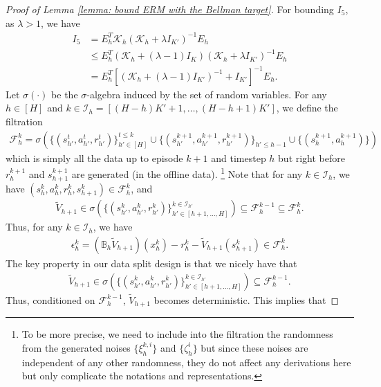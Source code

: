 \documentclass{article} \usepackage{iclr2023/iclr2023_conference,times}
\begin{document}
\begin{proof}[Proof of Lemma \ref{lemma: bound ERM with the Bellman target}]
For bounding $I_5$, as $\lambda > 1$, we have 
\begin{align}
    I_5  &= E_h^T  \mathcal{K}_h ( \mathcal{K}_h + \lambda I_{K'})^{-1} E_h \nonumber \\ 
    &\leq E_h^T  (\mathcal{K}_h + (\lambda-1) I_K) ( \mathcal{K}_h + \lambda I_{K'})^{-1} E_h \nonumber\\ 
    &=  E_h^T  \left[ (\mathcal{K}_h + (\lambda - 1) I_{K'})^{-1} + I_{K'} \right]^{-1} E_h. 
    \label{eq: transform the form of the self-normalized process}
\end{align}
Let $\sigma(\cdot)$ be the $\sigma$-algebra induced by the set of random variables. For any $h \in [H]$ and $k  \in \mathcal{I}_h = [(H - h) K' + 1, \ldots, (H - h + 1) K']$, we define the filtration 
\begin{align*}
    \mathcal{F}^k_h = \sigma \left(\{(s^t_{h'}, a^t_{h'}, r^t_{h'})\}_{h' \in [H]}^{t \leq k} \cup \{(s^{k+1}_{h'}, a^{k+1}_{h'}, r^{k+1}_{h'})\}_{h' \leq h-1} \cup \{(s^{k+1}_h, a^{k+1}_h)\} \right) 
\end{align*}
which is simply all the data up to episode $k+1$ and timestep $h$ but right before $r^{k+1}_h$ and $s^{k+1}_{h+1}$ are generated (in the offline data). \footnote{To be more precise, we need to include into the filtration the randomness from the generated noises $\{\xi^{k,i}_h\}$ and $\{\zeta^i_h\}$ but since these noises are independent of any other randomness, they do not affect any derivations here but only complicate the notations and representations.} Note that for any $k \in \mathcal{I}_h$, we have $(s^k_h, a^k_h, r^k_h, s^k_{h+1}) \in \mathcal{F}^k_h $, and
\begin{align*}
    \tilde{V}_{h+1} \in \sigma \left( \{(s^k_{h'}, a^k_{h'}, r^k_{h'})\}^{k \in \mathcal{I}_{h'}}_{h' \in [h+1, \ldots, H]}  \right) \subseteq \mathcal{F}^{k-1}_h \subseteq \mathcal{F}^k_h. 
\end{align*}
Thus, for any $k \in \mathcal{I}_h$, we have 
\begin{align*}
    \epsilon^k_h = (\mathbb{B}_h \tilde{V}_{h+1})(x^k_h) - r^k_h - \tilde{V}_{h+1}(s^k_{h+1}) \in \mathcal{F}^k_h. 
\end{align*}
The key property in our data split design is that we nicely have that
\begin{align*}
    \tilde{V}_{h+1} \in \sigma \left( \{(s^k_{h'}, a^k_{h'}, r^k_{h'})\}^{k \in \mathcal{I}_{h'}}_{h' \in [h+1, \ldots, H]}  \right) \subseteq \mathcal{F}^{k-1}_h.
\end{align*}
Thus, conditioned on $\mathcal{F}^{k-1}_h$, $\tilde{V}_{h+1}$ becomes deterministic. This implies that 

\end{proof}
\end{document}
